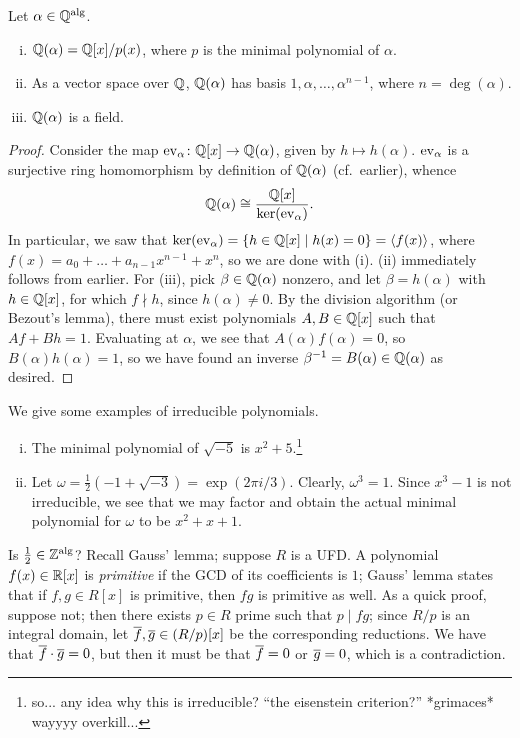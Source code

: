 \begin{proposition} \label{prop:minimal_polynomial_properties}
    Let $\alpha \in \operatorname{\mathbb Q^{\operatorname{alg}}}$.
    \begin{enumerate}[(i)]
        \item $\mathbb Q(\alpha) = \mathbb Q[x]/p(x)$, where $p$ is the minimal polynomial of $\alpha$.
        \item As a vector space over $\mathbb Q$, $\mathbb Q(\alpha)$ has basis $1, \alpha, \dots, \alpha^{n-1}$, where $n = \deg(\alpha)$.
        \item $\mathbb Q(\alpha)$ is a field.
    \end{enumerate}
\end{proposition}
\begin{proof}
    Consider the map $\operatorname{ev}_\alpha \colon \mathbb Q[x] \to \mathbb Q(\alpha)$, given by $h \mapsto h(\alpha)$. $\operatorname{ev}_\alpha$ is a surjective ring homomorphism by definition of $\mathbb Q(\alpha)$ (cf.\ earlier), whence
    \[ \mathbb Q(\alpha) \cong \frac{\mathbb Q[x]}{\ker(\operatorname{ev}_\alpha)}. \]
    In particular, we saw that $\ker(\operatorname{ev}_\alpha) = \{h \in \mathbb Q[x] \mid h(x) = 0\} = \left<f(x)\right>$, where $f(x) = a_0 + \dots + a_{n-1} x^{n-1} + x^n$, so we are done with (i). (ii) immediately follows from earlier. For (iii), pick $\beta \in \mathbb Q(\alpha)$ nonzero, and let $\beta = h(\alpha)$ with $h \in \mathbb Q[x]$, for which $f \nmid h$, since $h(\alpha) \neq 0$. By the division algorithm (or Bezout's lemma), there must exist polynomials $A, B \in \mathbb Q[x]$ such that $Af + Bh = 1$. Evaluating at $\alpha$, we see that $A(\alpha)f(\alpha) = 0$, so $B(\alpha)h(\alpha) = 1$, so we have found an inverse $\beta^{-1} = B(\alpha) \in \mathbb Q(\alpha)$ as desired.
\end{proof}

\begin{example}
    We give some examples of irreducible polynomials.
    \begin{enumerate}[(i)]
        \item The minimal polynomial of $\sqrt{-5}$ is $x^2 + 5$.\footnote{so... any idea why this is irreducible? ``the eisenstein criterion?'' *grimaces* wayyyy overkill...}
        \item Let $\omega = \frac{1}{2} (-1 + \sqrt{-3}) = \exp(2\pi i / 3)$. Clearly, $\omega^3 = 1$. Since $x^3 - 1$ is not irreducible, we see that we may factor and obtain the actual minimal polynomial for $\omega$ to be $x^2 + x + 1$.
    \end{enumerate}
\end{example}

Is $\frac{1}{2} \in \operatorname{\mathbb Z^{\operatorname{alg}}}$? Recall Gauss' lemma; suppose $R$ is a UFD. A polynomial $f(x) \in \mathbb R[x]$ is \textit{primitive} if the GCD of its coefficients is $1$; Gauss' lemma states that if $f, g \in R[x]$ is primitive, then $fg$ is primitive as well. As a quick proof, suppose not; then there exists $p \in R$ prime such that $p \mid fg$; since $R/p$ is an integral domain, let $\overline f, \overline g \in (R/p)[x]$ be the corresponding reductions. We have that $\overline f \cdot \overline g = 0$, but then it must be that $\overline f = 0$ or $\overline g = 0$, which is a contradiction.

